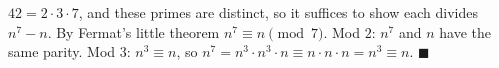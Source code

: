 $42=2\cdot3\cdot7$, and these primes are distinct, so it suffices to show each divides $n^7-n$. By Fermat's little theorem $n^7\equiv n\pmod7$. Mod $2$: $n^7$ and $n$ have the same parity. Mod $3$: $n^3\equiv n$, so $n^7=n^3\cdot n^3\cdot n\equiv n\cdot n\cdot n=n^3\equiv n$. $\blacksquare$
